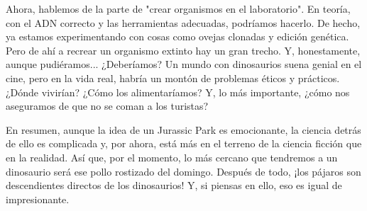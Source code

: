 Ahora, hablemos de la parte de "crear organismos en el laboratorio". En teoría, con el ADN correcto y las herramientas adecuadas, podríamos hacerlo. De hecho, ya estamos experimentando con cosas como ovejas clonadas y edición genética. Pero de ahí a recrear un organismo extinto hay un gran trecho. Y, honestamente, aunque pudiéramos... ¿Deberíamos? Un mundo con dinosaurios suena genial en el cine, pero en la vida real, habría un montón de problemas éticos y prácticos. ¿Dónde vivirían? ¿Cómo los alimentaríamos? Y, lo más importante, ¿cómo nos aseguramos de que no se coman a los turistas?

En resumen, aunque la idea de un Jurassic Park es emocionante, la ciencia detrás de ello es complicada y, por ahora, está más en el terreno de la ciencia ficción que en la realidad. Así que, por el momento, lo más cercano que tendremos a un dinosaurio será ese pollo rostizado del domingo. Después de todo, ¡los pájaros son descendientes directos de los dinosaurios! Y, si piensas en ello, eso es igual de impresionante.
